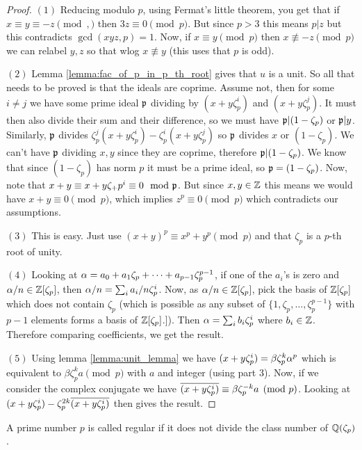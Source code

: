 \begin{proof}


	$(1)$  Reducing modulo $p$, using Fermat's little theorem, you get that if $x \equiv y \equiv -z \pmod,$ then $3z \equiv 0 \pmod p$. But since $p >3$ this means $p |z$ but this contradicts $\gcd(xyz,p)=1$. Now, if $x \equiv y \pmod p$ then  $x \not \equiv -z \pmod p$ we can relabel $y,z$ so that wlog $x \not \equiv y$ (this uses that $p$ is odd).


	$(2)$  Lemma \ref{lemma:fac_of_p_in_p_th_root} gives that $u$ is a unit. So all that needs to be proved is that the ideals are coprime. Assume not, then for some $i \neq j$ we have some prime ideal $\mathfrak{p}$ dividing by $(x+y\zeta_p^i)$ and $(x+y\zeta_p^j)$. It must then also divide their sum and their difference, so we must have $\mathfrak{p} | (1-\zeta_p)$ or $\mathfrak{p} | y$. Similarly, $\mathfrak{p}$ divides $\zeta_p^j(x+y\zeta_p^i)-\zeta_p^i(x+y\zeta_p^j)$ so $\mathfrak{p}$ divides $x$ or $(1-\zeta_p)$. We can't have $\mathfrak{p}$ dividing $x,y$ since they are coprime, therefore $\mathfrak{p} |(1-\zeta_p)$. We know that since $(1-\zeta_p)$ has norm $p$ it must be a prime ideal, so $\mathfrak{p}=(1-\zeta_p)$. Now, note that $x+y \equiv x+y\zeta_+p^i \equiv 0 \mod {\mathfrak{p}}$. But since $x,y \in \mathbb{Z}$ this means we would have $x+y \equiv 0 \pmod p$, which implies $z^p \equiv 0 \pmod p$ which contradicts our assumptions.

	$(3)$ This is easy. Just use $(x+y)^p \equiv x^p + y^p \pmod p$ and that $\zeta_p$ is a $p$-th root of unity.

	$(4)$  Looking at $\alpha=a_0+a_1\zeta_p+\cdots+a_{p-1}\zeta_p^{p-1}$, if one of the $a_i$'s is zero and $\alpha/n \in \mathbb{Z}[\zeta_p]$, then $\alpha/n=\sum_i a_i/n \zeta_p^i$. Now, as $\alpha/n \in \mathbb{Z}[\zeta_p]$, pick the basis of $\mathbb{Z}[\zeta_p]$ which does not contain $\zeta_p$ (which is possible as any subset of $\{1,\zeta_p,\dots,\zeta_p^{p-1}\}$ with $p-1$ elements forms a basis of $\mathbb{Z}[\zeta_p]$.]). Then $\alpha=\sum_i b_i \zeta_p^i$ where $b_i \in \mathbb{Z}$. Therefore comparing coefficients, we get the result.

	$(5)$  Using lemma \ref{lemma:unit_lemma} we have $(x+y\zeta_p^i) =\beta \zeta_p^k \alpha^p$ which is equivalent to $\beta \zeta_p^k a \pmod p$ with $a$ and integer (using part $3$). Now, if we consider the complex conjugate we have $\overline{(x+y\zeta_p^i)  }\equiv \beta \zeta_p^{-k}a \pmod p$. Looking at $(x+y\zeta_p^i)-\zeta_p^{2k}\overline{(x+y\zeta_p^i)  }$ then gives the result.
\end{proof}

\begin{definition}\label{defn:is_regular_number}
	\leanok
	A prime number $p$ is called regular if it does not divide the class number of $\mathbb{Q}(\zeta_p)$.
\end{definition}


